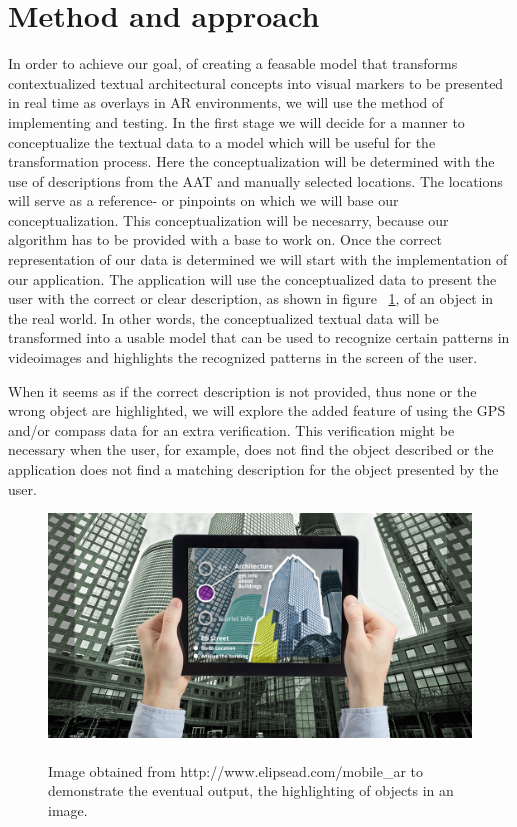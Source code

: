 \documentclass[12pt ]{article}
\begin{document}
\section{Method and approach}\label{method}
In order to achieve our goal, of creating a feasable model that transforms contextualized textual architectural concepts into visual markers to be presented in real time as overlays in AR environments, we will use the method of implementing and testing. 
In the first stage we will decide for a manner to  conceptualize the textual data to a model which will be useful for the transformation process. Here the conceptualization will be determined with the use of descriptions from the AAT and manually selected locations. The locations will serve as a reference- or pinpoints on which we will base our conceptualization. This conceptualization will be necesarry, because our algorithm has to be provided with a base to work on.
Once the correct representation of our data is determined we will start with the implementation of our application. The application will use the conceptualized data to present the user with the correct or clear description, as shown in figure ~\ref{fig:fig1}, of an object in the real world. In other words, the conceptualized textual data will be transformed into a usable model that can be used to recognize certain patterns in videoimages and highlights the recognized patterns in the screen of the user. 

When it seems as if the correct description is not provided, thus none or the wrong object are highlighted, we will explore the added feature of using the GPS and/or compass data for an extra verification. This verification might be necessary when the user, for example, does not find the object described or the application does not find a matching description for the object presented by the user. 

\begin{figure}
\includegraphics[scale=0.185]{AR_matching.png}
\captionsetup{font=scriptsize}
\caption{\\Image obtained from http://www.elipsead.com/mobile\_ar to demonstrate the eventual output, the highlighting of objects in an image.}
\label{fig:fig1}
\end{figure}
\end{document}
